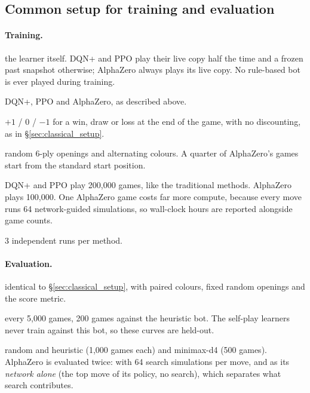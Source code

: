 \documentclass[11pt]{article}
\begin{document}
\subsection{Common setup for training and evaluation}
\label{sec:selfplay_setup}

\paragraph{Training.}
\begin{description}[leftmargin=1.2em,style=nextline,itemsep=2pt]
  \item[Opponent:] the learner itself. DQN+ and PPO play their live copy half
        the time and a frozen past snapshot otherwise; AlphaZero always plays
        its live copy. No rule-based bot is ever played during training.
  \item[Training algorithms:] DQN+, PPO and AlphaZero, as described above.
  \item[Reward:] $+1$ / $0$ / $-1$ for a win, draw or loss at the end of the
        game, with no discounting, as in \S\ref{sec:classical_setup}.
  \item[Games and openings:] random 6-ply openings and alternating colours. A
        quarter of AlphaZero's games start from the standard start position.
  \item[Budgets:] DQN+ and PPO play 200{,}000 games, like the traditional
        methods. AlphaZero plays 100{,}000. One AlphaZero game costs far more
        compute, because every move runs 64 network-guided simulations, so
        wall-clock hours are reported alongside game counts.
  \item[Seeds:] 3 independent runs per method.
\end{description}

\paragraph{Evaluation.}
\begin{description}[leftmargin=1.2em,style=nextline,itemsep=2pt]
  \item[Protocol:] identical to \S\ref{sec:classical_setup}, with paired
        colours, fixed random openings and the score metric.
  \item[Learning curves:] every 5{,}000 games, 200 games against the heuristic
        bot. The self-play learners never train against this bot, so these
        curves are held-out.
  \item[Final comparison:] random and heuristic (1{,}000 games each) and
        minimax-d4 (500 games). AlphaZero is evaluated twice: with 64 search
        simulations per move, and as its \emph{network alone} (the top move of
        its policy, no search), which separates what search contributes.
\end{description}
\end{document}
